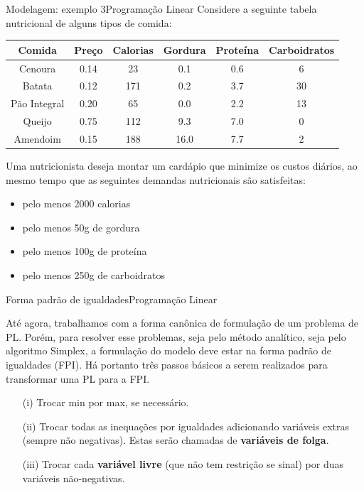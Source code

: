 \documentclass[t]{beamer}
\begin{document}
\begin{ftst}{Modelagem: exemplo 3}{Programação Linear}
Considere a seguinte tabela nutricional de alguns tipos de comida:

\begin{table}[]
\footnotesize
\centering
\begin{tabular}{|c|c|c|c|c|c|}
\hline
Comida       & Preço & Calorias & Gordura & Proteína & Carboidratos \\ \hline
Cenoura      & 0.14  & 23       & 0.1     & 0.6      & 6            \\ \hline
Batata       & 0.12  & 171      & 0.2     & 3.7      & 30           \\ \hline
Pão Integral & 0.20  & 65       & 0.0     & 2.2      & 13           \\ \hline
Queijo       & 0.75  & 112      & 9.3     & 7.0      & 0            \\ \hline
Amendoim     & 0.15  & 188      & 16.0    & 7.7      & 2            \\ \hline
\end{tabular}
\end{table}
\small
Uma nutricionista deseja montar um cardápio que minimize os custos diários, ao mesmo tempo que as seguintes demandas nutricionais são satisfeitas:
\begin{itemize}
    \item pelo menos 2000 calorias
    \item pelo menos 50g de gordura
    \item pelo menos 100g de proteína
    \item pelo menos 250g de carboidratos
\end{itemize}
\end{ftst}


\begin{ftst}{Forma padrão de igualdades}{Programação Linear}

Até agora, trabalhamos com a forma canônica de formulação de um problema de PL. Porém, para resolver esse problemas, seja pelo método analítico, seja pelo algoritmo Simplex, a formulação do modelo deve estar na forma padrão de igualdades (FPI).
\vone
Há portanto três passos básicos a serem realizados para transformar uma PL para a FPI.
\begin{itemize}
    \item[(i)] Trocar min por max, se necessário.
    \item[(ii)] Trocar todas as inequações por igualdades adicionando variáveis extras (sempre não negativas). Estas serão chamadas de \textbf{variáveis de folga}.
    \item[(iii)] Trocar cada \textbf{variável livre} (que não tem restrição se sinal) por duas variáveis não-negativas.
\end{itemize}
\end{ftst}
\end{document}
